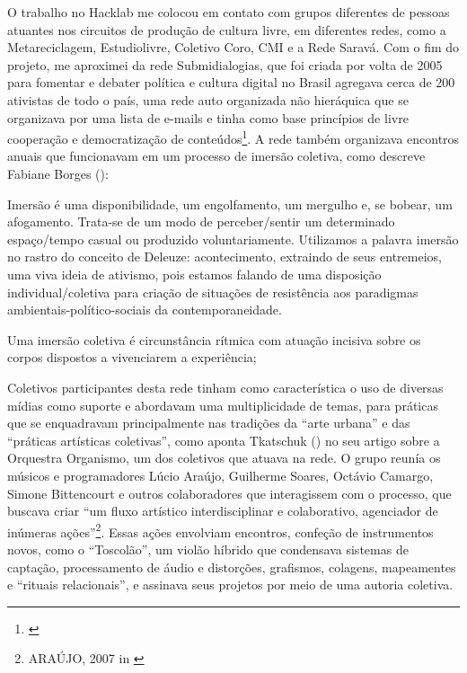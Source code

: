 O trabalho no Hacklab me colocou em contato com grupos diferentes de pessoas atuantes nos circuitos de produção de cultura livre, em diferentes redes, como a Metareciclagem, Estudiolivre, Coletivo Coro, CMI e a Rede Saravá. Com o fim do projeto, me aproximei da rede Submidialogias, que foi criada por volta de 2005 para fomentar e debater política e cultura digital no Brasil agregava cerca de 200 ativistas de todo o país, uma rede auto organizada não hieráquica que se organizava por uma lista de e-mails e tinha como base princípios de livre cooperação e democratização de conteúdos\footnote{\cite{Brunet}}. A rede também organizava encontros anuais que funcionavam em um processo de imersão coletiva, como descreve Fabiane Borges (\citeyear{FabianeMoraesBorges2010}):

\begin{citacao}
Imersão é uma disponibilidade, um engolfamento, um mergulho e, se bobear, um afogamento. Trata-se de um modo de perceber/sentir um determinado espaço/tempo casual ou produzido voluntariamente. Utilizamos a palavra imersão no rastro do conceito de Deleuze: acontecimento, extraindo de seus entremeios, uma viva ideia de ativismo, pois estamos falando de uma disposição individual/coletiva para criação de situações de resistência aos paradigmas ambientais-político-sociais da contemporaneidade.

Uma imersão coletiva é circunstância rítmica com atuação incisiva sobre os corpos dispostos a vivenciarem a experiência;
\end{citacao}
 
Coletivos participantes desta rede tinham como característica o uso de diversas mídias como suporte e abordavam uma multiplicidade de temas, para práticas que se enquadravam principalmente nas tradições da ``arte urbana'' e das ``práticas artísticas coletivas'', como aponta Tkatschuk (\citeyear{Tkatschuk2011}) no seu artigo sobre a Orquestra Organismo, um dos coletivos que atuava na rede. O grupo reunía os músicos e programadores Lúcio Araújo, Guilherme Soares, Octávio Camargo, Simone Bittencourt e outros colaboradores que interagissem com o processo, que buscava criar ``um fluxo artístico interdisciplinar e colaborativo, agenciador de inúmeras ações''\footnote{ARAÚJO, 2007 in \cite{Tkatschuk2011}}. Essas ações envolviam encontros, confeção de instrumentos novos, como o ``Toscolão'', um violão híbrido que condensava sistemas de captação, processamento de áudio e distorções, grafismos, colagens, mapeamentes e ``rituais relacionais'', e assinava seus projetos por meio de uma autoria coletiva. 




